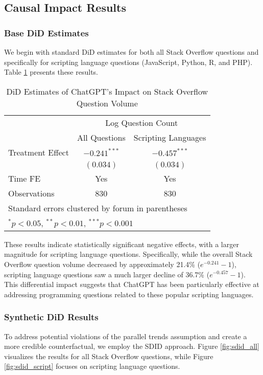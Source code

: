 \subsection{Causal Impact Results}

\subsubsection{Base DiD Estimates}
We begin with standard DiD estimates for both all Stack Overflow questions and specifically for scripting language questions (JavaScript, Python, R, and PHP). Table \ref{tab:did_results} presents these results.

\begin{table}[htpb!]
    \centering
    \caption{DiD Estimates of ChatGPT's Impact on Stack Overflow Question Volume}
    \label{tab:did_results}
    \begin{tabular}{lcc}
        \toprule
            & \multicolumn{2}{c}{Log Question Count} \\
            \cmidrule(lr){2-3}
            & All Questions & Scripting Languages \\
        \midrule
            Treatment Effect      & $-0.241^{***}$  & $-0.457^{***}$ \\
            & $(0.034)$       & $(0.034)$ \\
        \midrule
            Time FE               & Yes             & Yes \\
            Observations          & 830             & 830 \\
        \bottomrule
            \multicolumn{3}{l}{\footnotesize Standard errors clustered by forum in parentheses} \\
            \multicolumn{3}{l}{\footnotesize $^{*}p<0.05$, $^{**}p<0.01$, $^{***}p<0.001$} \\
    \end{tabular}
\end{table}

These results indicate statistically significant negative effects, with a larger magnitude for scripting language questions. Specifically, while the overall Stack Overflow question volume decreased by approximately 21.4\% ($e^{-0.241}-1$), scripting language questions saw a much larger decline of 36.7\% ($e^{-0.457}-1$). This differential impact suggests that ChatGPT has been particularly effective at addressing programming questions related to these popular scripting languages.

\subsubsection{Synthetic DiD Results}
To address potential violations of the parallel trends assumption and create a more credible counterfactual, we employ the SDID approach. Figure \ref{fig:sdid_all} visualizes the results for all Stack Overflow questions, while Figure \ref{fig:sdid_script} focuses on scripting language questions.

